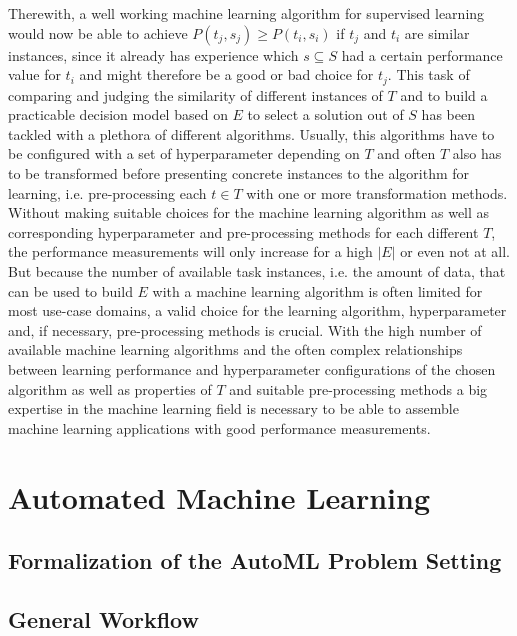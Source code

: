 Therewith, a well working machine learning algorithm for supervised learning would now be able to achieve $P(t_j, s_j) \geq P(t_i, s_i)$ if $t_j$ and $t_i$ are similar instances, since it already has experience which $s\subseteq S$ had a certain performance value for $t_i$ and might therefore be a good or bad choice for $t_j$.\newline
This task of comparing and judging the similarity of different instances of $T$ and to build a practicable decision model based on $E$ to select a solution out of $S$ has been tackled with a plethora of different algorithms.
Usually, this algorithms have to be configured with a set of hyperparameter depending on $T$ and often $T$ also has to be transformed before presenting concrete instances to the algorithm for learning, i.e. pre-processing each $t\in T$ with one or more transformation methods.
Without making suitable choices for the machine learning algorithm as well as corresponding hyperparameter and pre-processing methods for each different $T$, the performance measurements will only increase for a high $|E|$ or even not at all.
But because the number of available task instances, i.e. the amount of data, that can be used to build $E$ with a machine learning algorithm is often limited for most use-case domains, a valid choice for the learning algorithm, hyperparameter and, if necessary, pre-processing methods is crucial.
With the high number of available machine learning algorithms and the often complex relationships between learning performance and hyperparameter configurations of the chosen algorithm as well as properties of $T$ and suitable pre-processing methods a big expertise in the machine learning field is necessary to be able to assemble machine learning applications with good performance measurements.

\section{Automated Machine Learning}
\label{sec:theory:automl}

\Blindtext

\subsection{Formalization of the AutoML Problem Setting}
\label{sec:theory:automl:workflow}

\Blindtext

\subsection{General Workflow}
\label{sec:theory:automl:workflow}

